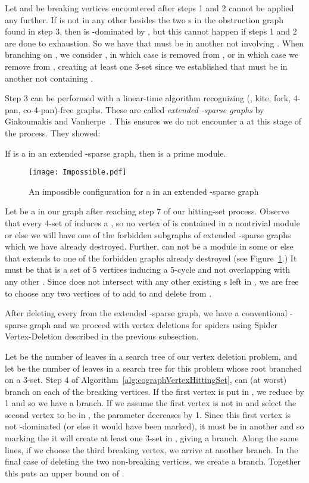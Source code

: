 \documentclass{llncs}
\begin{document}
Let  and  be breaking vertices encountered after steps 1 and 2 cannot be applied any further. If  is not in any other  besides the two s in the obstruction graph found in step 3, then  is -dominated by , but this cannot happen if steps 1 and 2 are done to exhaustion. So we have that  must be in another  not involving . When branching on , we consider , in which case  is removed from , or  in which case we remove  from , creating at least one 3-set since we established that  must be in another  not containing .

Step 3 can be performed with a linear-time algorithm recognizing (, kite, fork, 4-pan, co-4-pan)-free graphs. These are called \emph{extended -sparse graphs} by Giakoumakis and Vanherpe~\cite{GV}. This ensures we do not encounter a  at this stage of the process. They showed:

\begin{theorem}\cite{GV}
If  is a  in an extended -sparse graph, then  is a prime module.
\end{theorem}

\begin{figure}
    \hspace{3.6cm}
  \texttt{[image: Impossible.pdf]}\\
  \caption{An impossible configuration for a  in an extended -sparse graph}\label{impossible}
\end{figure}

Let  be a  in our graph after reaching step 7 of our hitting-set process. Observe that every 4-set of  induces a , so no vertex of  is contained in a nontrivial module or else we will have one of the forbidden subgraphs of extended -sparse graphs which we have already destroyed. Further,  can not be a module in some  or else that  extends to one of the forbidden graphs already destroyed (see Figure~\ref{impossible}.) It must be that  is a set of 5 vertices inducing a 5-cycle and not overlapping with any other . Since  does not intersect with any other existing s left in , we are free to choose any two vertices of  to add to  and delete from .

After deleting every  from the extended -sparse graph, we have a conventional -sparse graph and we proceed with vertex deletions for spiders using {\sc Spider Vertex-Deletion} described in the previous subsection.

Let  be the number of leaves in a search tree of our vertex deletion problem, and let  be the number of leaves in a search tree for this problem whose root branched on a 3-set. Step 4 of Algorithm~\ref{alg:cographVertexHittingSet}, can (at worst) branch on each of the breaking vertices. If the first vertex is put in , we reduce  by 1 and so we have a  branch. If we assume the first vertex is not in  and select the second vertex to be in , the parameter decreases by 1. Since this first vertex is not -dominated (or else it would have been marked), it must be in another  and so marking the it will create at least one 3-set in , giving a  branch. Along the same lines, if we choose the third breaking vertex, we arrive at another  branch. In the final case of deleting the two non-breaking vertices, we create a  branch. Together this puts an upper bound on  of .
\end{document}
